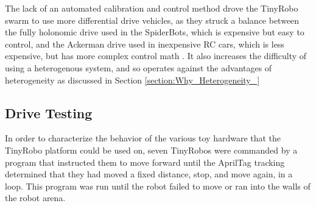 The lack of an automated calibration and control method drove the TinyRobo swarm to use more differential drive vehicles, as they struck a balance between the fully holonomic drive used in the SpiderBots, which is expensive but easy to control, and the Ackerman drive used in inexpensive RC cars, which is less expensive, but has more complex control math \citep{lairdspider}.
It also increases the difficulty of using a heterogenous system, and so operates against the advantages of heterogeneity as discussed in Section \ref{section:Why_Heterogeneity_}

%
%


\subsection{Drive Testing} \label{section:Drive_Testing}

In order to characterize the behavior of the various toy hardware that the TinyRobo platform could be used on, seven TinyRobos were commanded by a program that instructed them to move forward until the AprilTag tracking determined that they had moved a fixed distance, stop, and move again, in a loop. This program was run until the robot failed to move or ran into the walls of the robot arena.

